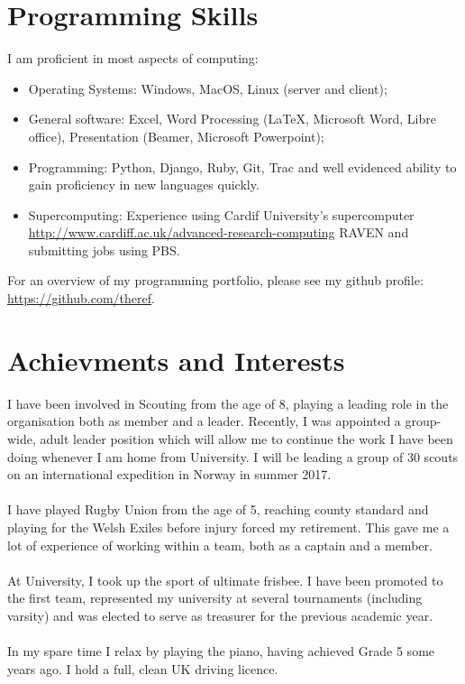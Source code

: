 \documentclass[a4paper]{article}
\begin{document}
\section{Programming Skills}
I am proficient in most aspects of computing:

\begin{itemize}
    \item Operating Systems: Windows, MacOS, Linux (server and client);
    \item General software: Excel, Word Processing (\LaTeX, Microsoft Word, Libre office), Presentation (Beamer, Microsoft Powerpoint);
    \item Programming: Python, Django, Ruby, Git, Trac and well evidenced ability to gain proficiency in new languages quickly.
    \item Supercomputing: Experience using Cardif University's supercomputer \url{http://www.cardiff.ac.uk/advanced-research-computing} RAVEN and submitting jobs using PBS.
\end{itemize}

For an overview of my programming portfolio, please see my github profile: \url{https://github.com/theref}.
\section{Achievments and Interests}
I have been involved in Scouting from the age of 8, playing a leading role in the organisation both as member and a leader.
Recently, I was appointed a group-wide, adult leader position which will allow me to continue the work I have been doing whenever I am home from University.
I will be leading a group of 30 scouts on an international expedition in Norway in summer 2017.\\
\\
I have played Rugby Union from the age of 5, reaching county standard and playing for the Welsh Exiles before injury forced my retirement.
This gave me a lot of experience of working within a team, both as a captain and a member. \\
\\
At University, I took up the sport of ultimate frisbee. I have been promoted to the first team, represented my university at several tournaments (including varsity) and was elected to serve as treasurer for the previous academic year. \\
\\
In my spare time I relax by playing the piano, having achieved Grade 5 some years ago. I hold a full, clean UK driving licence.
\end{document}
